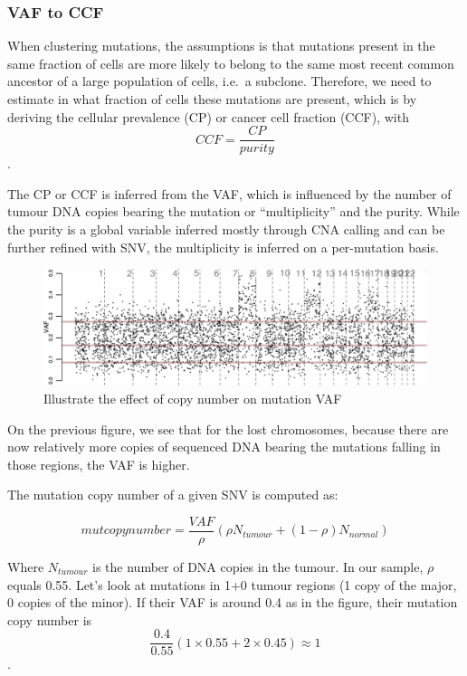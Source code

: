 \documentclass[]{article}
\begin{document}
\hypertarget{vaf-to-ccf}{%
\subsubsection{VAF to CCF}\label{vaf-to-ccf}}

When clustering mutations, the assumptions is that mutations present in
the same fraction of cells are more likely to belong to the same most
recent common ancestor of a large population of cells, i.e.~a subclone.
Therefore, we need to estimate in what fraction of cells these mutations
are present, which is by deriving the cellular prevalence (CP) or cancer
cell fraction (CCF), with \[CCF=\frac{CP}{purity}\].

The CP or CCF is inferred from the VAF, which is influenced by the
number of tumour DNA copies bearing the mutation or ``multiplicity'' and
the purity. While the purity is a global variable inferred mostly
through CNA calling and can be further refined with SNV, the
multiplicity is inferred on a per-mutation basis.

\begin{figure}

{\centering \includegraphics{src_guide_files/figure-latex/fig6-1} 

}

\caption{\label{fig6} Illustrate the effect of copy number on mutation VAF}\label{fig:fig6}
\end{figure}

On the previous figure, we see that for the lost chromosomes, because
there are now relatively more copies of sequenced DNA bearing the
mutations falling in those regions, the VAF is higher.

The mutation copy number of a given SNV is computed as:

\[ mutcopynumber=\frac{VAF}{\rho}(\rho N_{tumour} + (1-\rho) N_{normal})\]

Where \(N_{tumour}\) is the number of DNA copies in the tumour. In our
sample, \(\rho\) equals 0.55. Let's look at mutations in 1+0 tumour
regions (1 copy of the major, 0 copies of the minor). If their VAF is
around 0.4 as in the figure, their mutation copy number is
\[\frac{0.4}{0.55}(1\times0.55+2\times0.45)\approx
                                1\].
\end{document}
